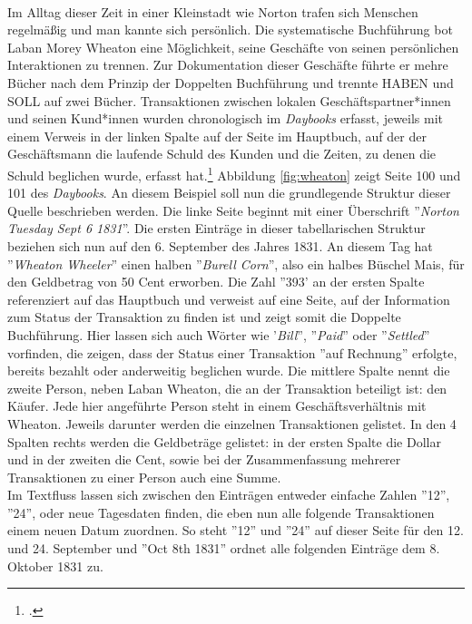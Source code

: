 \documentclass[12pt,a4paper]{article}
\begin{document}
\\
Im Alltag dieser Zeit in einer Kleinstadt wie Norton trafen sich Menschen regelmäßig und man kannte sich persönlich. Die systematische Buchführung bot Laban Morey Wheaton eine Möglichkeit, seine Geschäfte von seinen persönlichen Interaktionen zu trennen. Zur Dokumentation dieser Geschäfte führte er mehre Bücher nach dem Prinzip der Doppelten Buchführung und trennte HABEN und SOLL auf zwei Bücher. Transaktionen zwischen lokalen Geschäftspartner*innen und seinen Kund*innen wurden chronologisch im \textit{Daybooks} erfasst, jeweils mit einem Verweis in der linken Spalte auf der Seite im Hauptbuch, auf der der Geschäftsmann die laufende Schuld des Kunden und die Zeiten, zu denen die Schuld beglichen wurde, erfasst hat.\footcite[][S.7-9]{tomasek2013encoding} Abbildung \ref{fig:wheaton} zeigt Seite 100 und 101 des \textit{Daybooks}. An diesem Beispiel soll nun die grundlegende Struktur dieser Quelle beschrieben werden. Die linke Seite beginnt mit einer Überschrift ''\textit{Norton Tuesday Sept 6 1831}''. Die ersten Einträge in dieser tabellarischen Struktur beziehen sich nun auf den 6. September des Jahres 1831. An diesem Tag hat ''\textit{Wheaton Wheeler}'' einen halben ''\textit{Burell Corn}'', also ein halbes Büschel Mais, für den Geldbetrag von 50 Cent erworben. Die Zahl ''393' an der ersten Spalte referenziert auf das Hauptbuch und verweist auf eine Seite, auf der Information zum Status der Transaktion zu finden ist und zeigt somit die Doppelte Buchführung. Hier lassen sich auch Wörter wie '\textit{Bill}'', ''\textit{Paid}'' oder ''\textit{Settled}'' vorfinden, die zeigen, dass der Status einer Transaktion ''auf Rechnung'' erfolgte, bereits bezahlt oder anderweitig beglichen wurde. Die mittlere Spalte nennt die zweite Person, neben Laban Wheaton, die an der Transaktion beteiligt ist: den Käufer. Jede hier angeführte Person steht in einem Geschäftsverhältnis mit Wheaton. Jeweils darunter werden die einzelnen Transaktionen gelistet. In den 4 Spalten rechts werden die Geldbeträge gelistet: in der ersten Spalte die Dollar und in der zweiten die Cent, sowie bei der Zusammenfassung mehrerer Transaktionen zu einer Person auch eine Summe.
\\
Im Textfluss lassen sich zwischen den Einträgen entweder einfache Zahlen ''12'', ''24'', oder neue Tagesdaten finden, die eben nun alle folgende Transaktionen einem neuen Datum zuordnen. So steht ''12'' und ''24'' auf dieser Seite für den 12. und 24. September und ''Oct 8th 1831'' ordnet alle folgenden Einträge  dem 8. Oktober 1831 zu.
\\
\end{document}
